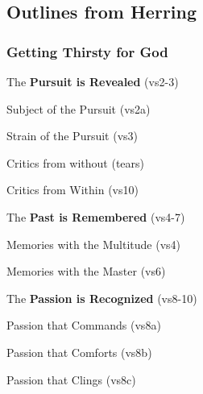 \subsection{Outlines from Herring}

\subsubsection{Getting Thirsty for God}


\begin{compactenum}[I.][19]
    \item The \textbf{Pursuit is Revealed} (vs2-3)
    \begin{compactenum}[A.]
		\item Subject of the Pursuit (vs2a)
		\item Strain of the Pursuit (vs3)
		\begin{compactenum}[1.]
		    \item Critics from without (tears)
		    \item Critics from Within (vs10) 
		\end{compactenum}
	\end{compactenum}
    \item The \textbf{Past is Remembered} (vs4-7)
    \begin{compactenum}[A.]
		\item Memories with the Multitude (vs4)
		\item Memories with the Master (vs6)
	\end{compactenum}
    \item The \textbf{Passion is Recognized} (vs8-10)
    \begin{compactenum}[A.]
		\item Passion that Commands (vs8a)
		\item Passion that Comforts (vs8b)
		\item Passion that Clings (vs8c)
	\end{compactenum}
\end{compactenum}


